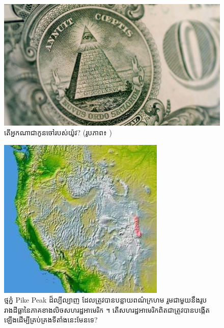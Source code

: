 \documentclass[10pt,twocolumn,letterpaper]{article}
\begin{document}
\begin{figure}[t]
\begin{center}
   \includegraphics[width=1\linewidth]{illuminati.jpg}
\end{center}
   \caption{តើអ្នកណាជាកូនចៅរបស់យ៉ូវ? (រូបភាព៖ \cite{35})}
\label{fig:10}
\label{fig:onecol}
\end{figure}

\begin{figure}[t]
\begin{center}
   \includegraphics[width=1\linewidth]{pike.jpg}
\end{center}
   \caption{ថ្មភ្នំ Pike Peak ដ៏ល្បីល្បាញ ដែលត្រូវបានបន្លាយពណ៌ក្រហម រួមជាមួយនឹងរូបរាងដីធ្លានៃភាគខាងលិចសហរដ្ឋអាមេរិក \cite{36}។ តើសហរដ្ឋអាមេរិកពិតជាត្រូវបានបង្កើតឡើងដើម្បីគ្រប់គ្រងទីតាំងនេះមែនទេ?}
\label{fig:11}
\label{fig:onecol}
\end{figure}
\end{document}

